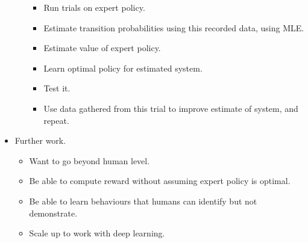 \begin{itemize}
\begin{itemize}
\begin{itemize}
            \item Run trials on expert policy.
            \item Estimate transition probabilities using this recorded data, using MLE.
            \item Estimate value of expert policy.
            \item Learn optimal policy for estimated system.
            \item Test it.
            \item Use data gathered from this trial to improve estimate of system, and repeat.
        \end{itemize}
    \end{itemize}
    \item Further work.
    \begin{itemize}
        \item Want to go beyond human level.
        \item Be able to compute reward without assuming expert policy is optimal.
        \item Be able to learn behaviours that humans can identify but not demonstrate.
        \item Scale up to work with deep learning.
    \end{itemize}
\end{itemize}